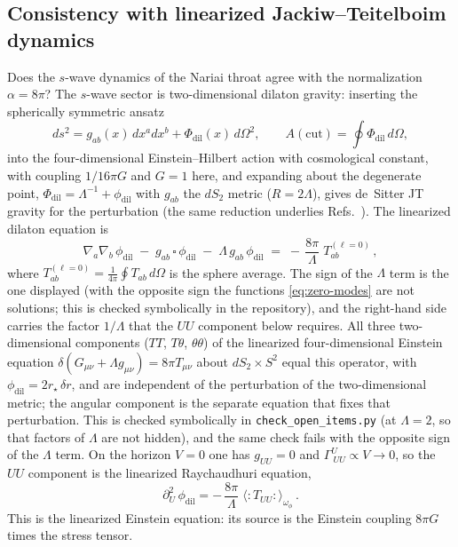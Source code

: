 \documentclass[11pt]{article}
\begin{document}
\subsection{Consistency with linearized Jackiw--Teitelboim dynamics}
\label{sec:JT}

Does the $s$-wave dynamics of the Nariai throat agree with the normalization $\alpha=8\pi$? The $s$-wave sector is two-dimensional dilaton gravity: inserting the spherically symmetric ansatz
\begin{equation}
ds^2 = g_{ab}(x)\, dx^a dx^b + \Phi_{\mathrm{dil}}(x)\, d\Omega^2,
\qquad
A(\mathrm{cut}) = \oint \Phi_{\mathrm{dil}}\, d\Omega ,
\label{eq:JT-ansatz}
\end{equation}
into the four-dimensional Einstein--Hilbert action with cosmological constant, with coupling $1/16\pi G$ and $G=1$ here, and expanding about the degenerate point, $\Phi_{\mathrm{dil}} = \Lambda^{-1} + \phi_{\mathrm{dil}}$ with $g_{ab}$ the $dS_2$ metric ($R = 2\Lambda$), gives de~Sitter JT gravity for the perturbation \cite{MertensTuriaci} (the same reduction underlies Refs.~\cite{FanarasVilenkin,Rusalev}). The linearized dilaton equation is
\begin{equation}
\nabla_a \nabla_b\, \phi_{\mathrm{dil}} \;-\; g_{ab}\,\square\, \phi_{\mathrm{dil}} \;-\; \Lambda\, g_{ab}\, \phi_{\mathrm{dil}}
\;=\; -\,\frac{8\pi}{\Lambda}\; T^{(\ell=0)}_{ab}\,,
\label{eq:JT-eom}
\end{equation}
where $T^{(\ell=0)}_{ab}=\frac{1}{4\pi}\oint T_{ab}\,d\Omega$ is the sphere average. The sign of the $\Lambda$ term is the one displayed (with the opposite sign the functions \eqref{eq:zero-modes} are not solutions; this is checked symbolically in the repository), and the right-hand side carries the factor $1/\Lambda$ that the $UU$ component below requires. All three two-dimensional components ($TT$, $T\theta$, $\theta\theta$) of the linearized four-dimensional Einstein equation $\delta(G_{\mu\nu}+\Lambda g_{\mu\nu})=8\pi T_{\mu\nu}$ about $dS_2\times S^2$ equal this operator, with $\phi_{\mathrm{dil}}=2r_\star\,\delta r$, and are independent of the perturbation of the two-dimensional metric; the angular component is the separate equation that fixes that perturbation. This is checked symbolically in \texttt{check\_open\_items.py} (at $\Lambda=2$, so that factors of $\Lambda$ are not hidden), and the same check fails with the opposite sign of the $\Lambda$ term. On the horizon $V=0$ one has $g_{UU}=0$ and $\Gamma^U_{\ UU}\propto V\to0$, so the $UU$ component is the linearized Raychaudhuri equation,
\begin{equation}
\partial_U^2\, \phi_{\mathrm{dil}}
= -\,\frac{8\pi}{\Lambda}\; \langle{:}T_{UU}{:}\rangle_{\omega_\phi}\,.
\label{eq:JT-null}
\end{equation}
This is the linearized Einstein equation: its source is the Einstein coupling $8\pi G$ times the stress tensor.
\end{document}
